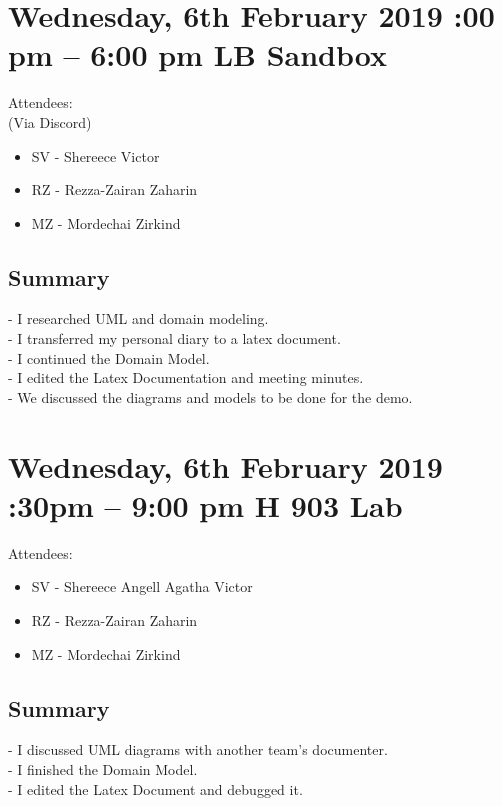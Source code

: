 \documentclass[12pt]{article}
\begin{document}
\section{Wednesday, 6th February 2019 :00 pm – 6:00 pm \textbar LB Sandbox}

Attendees:\\ 
(Via Discord) \\
\begin{itemize}
	\item SV - Shereece Victor
	\item RZ - Rezza-Zairan Zaharin
	\item MZ - Mordechai Zirkind
\end{itemize}
\subsection{Summary}
-	I researched UML and domain modeling.\\
-	I transferred my personal diary to a latex document.\\
-	I continued the Domain Model.\\
-	I edited the Latex Documentation and meeting minutes.\\
-	We discussed the diagrams and models to be done for the demo.\\ 
 

\section{Wednesday, 6th February 2019 :30pm – 9:00 pm \textbar H 903 Lab}

Attendees: 
\begin{itemize}
	\item SV - Shereece Angell Agatha Victor
	\item RZ - Rezza-Zairan Zaharin
	\item MZ - Mordechai Zirkind
\end{itemize}

 \subsection{Summary}
-	I discussed UML diagrams with another team’s documenter.\\
-	I finished the Domain Model.\\
-	I edited the Latex Document and debugged it.\\
\end{document}
